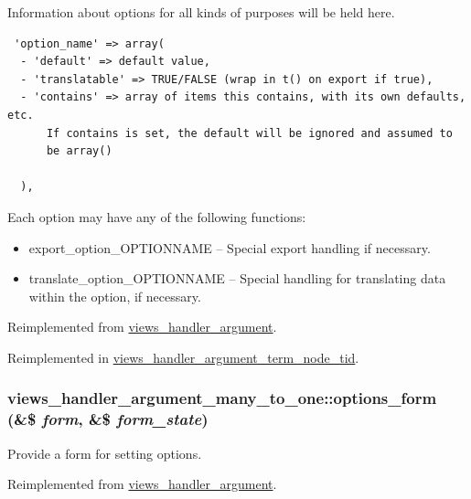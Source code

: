 Information about options for all kinds of purposes will be held here. 

\begin{Code}\begin{verbatim} 'option_name' => array(
  - 'default' => default value,
  - 'translatable' => TRUE/FALSE (wrap in t() on export if true),
  - 'contains' => array of items this contains, with its own defaults, etc.
      If contains is set, the default will be ignored and assumed to
      be array()

  ),
\end{verbatim}
\end{Code}

 Each option may have any of the following functions:\begin{itemize}
\item export\_\-option\_\-OPTIONNAME -- Special export handling if necessary.\item translate\_\-option\_\-OPTIONNAME -- Special handling for translating data within the option, if necessary. \end{itemize}


Reimplemented from \hyperlink{classviews__handler__argument_117ab20a53624e082e6e32a22d4521cc}{views\_\-handler\_\-argument}.

Reimplemented in \hyperlink{classviews__handler__argument__term__node__tid_aa442cbd37f901be13e6db17f61e8d02}{views\_\-handler\_\-argument\_\-term\_\-node\_\-tid}.\hypertarget{classviews__handler__argument__many__to__one_dd3ed7d59f17d79f48ef8f47e049cb92}{
\subsubsection[{options\_\-form}]{\setlength{\rightskip}{0pt plus 5cm}views\_\-handler\_\-argument\_\-many\_\-to\_\-one::options\_\-form (\&\$ {\em form}, \/  \&\$ {\em form\_\-state})}}
\label{classviews__handler__argument__many__to__one_dd3ed7d59f17d79f48ef8f47e049cb92}


Provide a form for setting options. 

Reimplemented from \hyperlink{classviews__handler__argument_44f015a0d527983ae6df2689f66b2c24}{views\_\-handler\_\-argument}.

